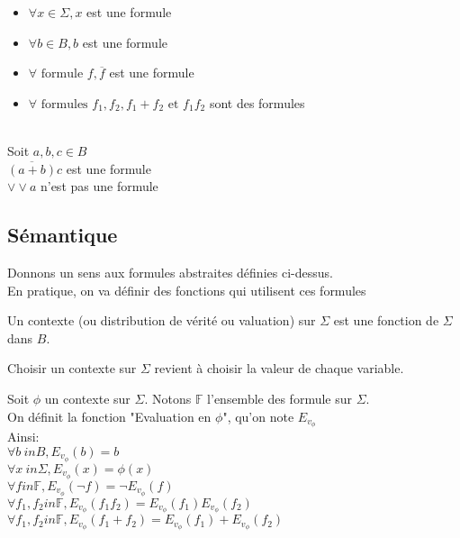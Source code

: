 \begin{itemize}
    \item $\forall x \in \Sigma,x$ est une formule
    \item $\forall b \in B,b$ est une formule
    \item $\forall \text{ formule } f, \overline{f}$ est une formule
    \item $\forall \text{ formules } f_1,f_2, f_1+f_2 \text{ et } f_1f_2$ sont des formules
\end{itemize}

\begin{exemple}\\
    Soit $a,b,c \in B$\\
    $\overline{(a+b)}c$ est une formule\\
    $\lor \lor a$ n'est pas une formule\\
\end{exemple} 

\subsection{Sémantique}

Donnons un sens aux formules abstraites définies ci-dessus.\\

En pratique, on va définir des fonctions qui utilisent ces formules

\begin{def}
    Un contexte (ou distribution de vérité ou valuation) sur $\Sigma$ est une fonction de $\Sigma$ dans $B$.\\
\end{def}

Choisir un contexte sur $\Sigma$ revient à choisir la valeur de chaque variable.

\begin{def}
    Soit $\phi$ un contexte sur $\Sigma$. Notons $\mathbb{F}$ l'ensemble des formule sur $\Sigma$.\\

    On définit la fonction "Evaluation en $\phi$", qu'on note $E_v_{\phi}$\\
    Ainsi:\\
    $\forall b \ in B, E_v_{\phi}(b)=b$ \\
    $\forall x \ in \Sigma, E_v_{\phi}(x)=\phi(x)$ \\
    $\forall f in \mathbb{F},E_v_{\phi}(\lnot f)=\lnot E_v_{\phi}(f)$ \\
    $\forall f_1,f_2 in \mathbb{F},E_v_{\phi}(f_1f_2)= E_v_{\phi}(f_1)E_v_{\phi}(f_2)$ \\
    $\forall f_1,f_2 in \mathbb{F},E_v_{\phi}(f_1+f_2)= E_v_{\phi}(f_1)+E_v_{\phi}(f_2)$ \\
\end{def}

